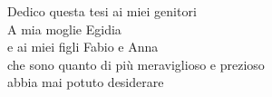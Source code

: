 \thispagestyle{empty}
{}

\vspace*{3cm}
\begin{center}
    Dedico questa tesi ai miei genitori \\ \medskip
    A mia moglie Egidia \\ \medskip
    e ai miei figli Fabio e Anna \\ \medskip
    che sono quanto di più meraviglioso e prezioso \\ \medskip
    abbia mai potuto desiderare \\ \medskip
\end{center}